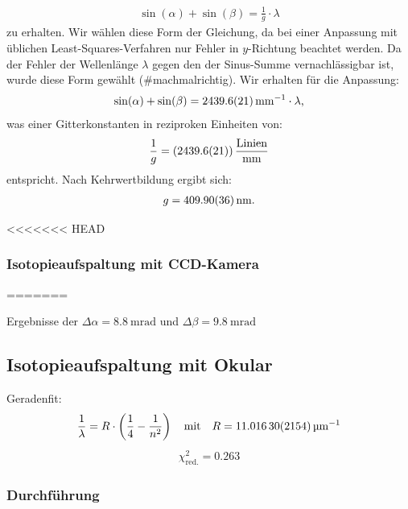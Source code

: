 \documentclass[11pt, a4paper]{article}
\numberwithin{equation}{section}
\begin{document}
\begin{align*}
	\sin(\alpha) + \sin(\beta) = \frac{1}{g} \cdot \lambda
\end{align*}
zu erhalten.
Wir wählen diese Form der Gleichung, da bei einer Anpassung mit üblichen Least-Squares-Verfahren nur Fehler in $y$-Richtung beachtet werden.
Da der Fehler der Wellenlänge $\lambda$ gegen den der Sinus-Summe vernachlässigbar ist, wurde diese Form gewählt (\#machmalrichtig).
Wir erhalten für die Anpassung:
\begin{align}
	\sin(\alpha) + \sin(\beta) = \SI{2439.6 +- 2.1}{\per\milli\metre} \cdot \lambda \text{,}
\end{align}
was einer Gitterkonstanten in reziproken Einheiten von:
\begin{align*}
	\frac{1}{g} = (\num{2439.6 +- 2.1}) \, \frac{\mathrm{Linien}}{\si{\milli\metre}}
\end{align*}
entspricht.
Nach Kehrwertbildung ergibt sich:
\begin{align*}
	g = \SI{409.90 +- 0.36}{\nano\metre} \text{.}
\end{align*}

<<<<<<< HEAD
\subsubsection{Isotopieaufspaltung mit CCD-Kamera}
=======
\begin{table}[h]
	\centering
	
	\caption{Ergebnisse der $\Delta \alpha = \SI{8.8}{\milli\radian}$ und $\Delta \beta = \SI{9.8}{\milli\radian}$}
	\label{tab:gitterkonstante_umrechnung_winkel}
\end{table}

\subsection{Isotopieaufspaltung mit Okular}

Geradenfit:
\begin{align*}
	\frac{1}{\lambda} = R \cdot \left( \frac{1}{4} - \frac{1}{n^2} \right) \quad \text{mit} \quad R = \SI{11.0163 +- 0.02154}{\per\micro\metre}
\end{align*}
\begin{align*}
	\chi_\mathrm{red.}^2 = \num{0.263}
\end{align*}


\subsubsection{Durchführung}
\label{sec:balmer_okular}
\end{document}
